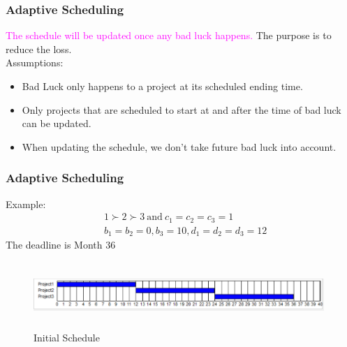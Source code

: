 \documentclass{beamer}
\newcommand{\tblue}{\textcolor{blue}}
\newcommand{\tmag}{\textcolor{magenta}}
\begin{document}


\begin{frame}
\frametitle{Adaptive Scheduling}
\tmag{The schedule will be updated once any bad luck happens.}
The purpose is to reduce the loss. \\
\bigskip
Assumptions:
\begin{itemize}
\item Bad Luck only happens to a project at its scheduled ending time.
\medskip
\item Only projects that are scheduled to start at and after the time of bad luck can be updated.
\medskip
\item When updating the schedule, we don't take future bad luck into account.
\end{itemize}
\end{frame}

\begin{frame}
\frametitle{Adaptive Scheduling}
Example:
\begin{displaymath}
\begin{array}{ll}
&1\succ 2\succ 3~\mbox{and}~c_1=c_2=c_3=1\\
&b_1=b_2=0, b_3=10, d_1=d_2=d_3=12
\end{array}
\end{displaymath}
The deadline is Month 36
\begin{figure}
\includegraphics[scale=0.35, width=11cm, height=2.5cm]{Adapt1.png}
\caption{Initial Schedule}
\end{figure}
\end{frame}
\end{document}
